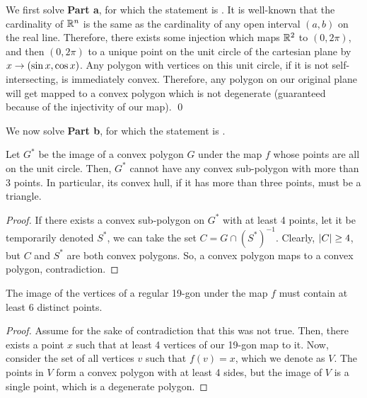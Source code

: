 \documentclass[10pt]{../usamts}
\begin{document}
\begin{solution}

We first solve \textbf{Part a}, for which the statement is . It is well-known that the cardinality of $\mathbb{R}^n$ is the same as the cardinality of any open interval $(a,b)$ on the real line. Therefore, there exists some injection which maps $\mathbb{R}^2$ to $(0,2\pi)$, and then $(0,2\pi)$ to a unique point on the unit circle of the cartesian plane by $x \rightarrow \left( \sin{x}, \cos{x} \right)$.
 Any polygon with vertices on this unit circle, if it is not self-intersecting, is immediately convex. Therefore, any polygon on our original plane will get mapped to a convex polygon which is not degenerate (guaranteed because of the injectivity of our map). 
 \qed

We now solve \textbf{Part b}, for which the statement is .
\begin{claim}
    Let $G^*$ be the image of a convex polygon $G$ under the map $f$ whose points are all on the unit circle. Then, $G^*$ cannot have any convex sub-polygon with more than 3 points. In particular, its convex hull, if it has more than three points, must be a triangle.
\end{claim}
\begin{proof}
    If there exists a convex sub-polygon on $G^*$ with at least 4 points, let it be temporarily denoted $S^*$, we can take the set $C = G \cap (S^*)^{-1}$. Clearly, $\left| C \right| \geq 4$, but $C$ and $S^*$ are both convex polygons. So, a convex polygon maps to a convex polygon, contradiction.
\end{proof}

\begin{claim}
    The image of the vertices of a regular 19-gon under the map $f$ must contain at least 6 distinct points.
\end{claim}
\begin{proof}
    Assume for the sake of contradiction that this was not true. Then, there exists a point $x$ such that at least 4 vertices of our 19-gon map to it. Now, consider the set of all vertices $v$ such that $f(v) = x$, which we denote as $V$. The points in $V$ form a convex polygon with at least 4 sides, but the image of $V$ is a single point, which is a degenerate polygon.
\end{proof}


\end{solution}
\end{document}
